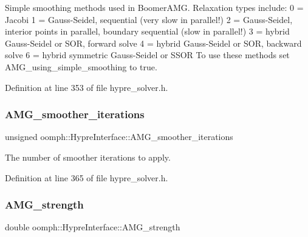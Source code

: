 Simple smoothing methods used in Boomer\+A\+MG. Relaxation types include\+: 0 = Jacobi 1 = Gauss-\/\+Seidel, sequential (very slow in parallel!) 2 = Gauss-\/\+Seidel, interior points in parallel, boundary sequential (slow in parallel!) 3 = hybrid Gauss-\/\+Seidel or S\+OR, forward solve 4 = hybrid Gauss-\/\+Seidel or S\+OR, backward solve 6 = hybrid symmetric Gauss-\/\+Seidel or S\+S\+OR To use these methods set A\+M\+G\+\_\+using\+\_\+simple\+\_\+smoothing to true. 



Definition at line 353 of file hypre\+\_\+solver.\+h.

\mbox{\label{classoomph_1_1HypreInterface_a968f16488385d717c96993883cf4a680}} 
\subsubsection{\texorpdfstring{A\+M\+G\+\_\+smoother\+\_\+iterations}{AMG\_smoother\_iterations}}
{\footnotesize\ttfamily unsigned oomph\+::\+Hypre\+Interface\+::\+A\+M\+G\+\_\+smoother\+\_\+iterations\hspace{0.3cm}{\ttfamily [protected]}}



The number of smoother iterations to apply. 



Definition at line 365 of file hypre\+\_\+solver.\+h.

\mbox{\label{classoomph_1_1HypreInterface_a1e87cc2c06ff1391b293e636b19236ea}} 
\subsubsection{\texorpdfstring{A\+M\+G\+\_\+strength}{AMG\_strength}}
{\footnotesize\ttfamily double oomph\+::\+Hypre\+Interface\+::\+A\+M\+G\+\_\+strength\hspace{0.3cm}{\ttfamily [protected]}}



